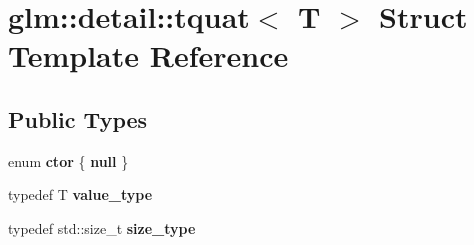 \hypertarget{structglm_1_1detail_1_1tquat}{\section{glm\-:\-:detail\-:\-:tquat$<$ T $>$ Struct Template Reference}
\label{structglm_1_1detail_1_1tquat}
}
\subsection*{Public Types}
\begin{DoxyCompactItemize}
\item 
enum {\bfseries ctor} \{ {\bfseries null}
 \}
\item 
\hypertarget{structglm_1_1detail_1_1tquat_a32846d2b5305ba522a7f278c47c59a4f}{typedef T {\bfseries value\-\_\-type}}\label{structglm_1_1detail_1_1tquat_a32846d2b5305ba522a7f278c47c59a4f}

\item 
\hypertarget{structglm_1_1detail_1_1tquat_a05ffe74d48f5fb0789427706d209ffdc}{typedef std\-::size\-\_\-t {\bfseries size\-\_\-type}}\label{structglm_1_1detail_1_1tquat_a05ffe74d48f5fb0789427706d209ffdc}

\end{DoxyCompactItemize}
